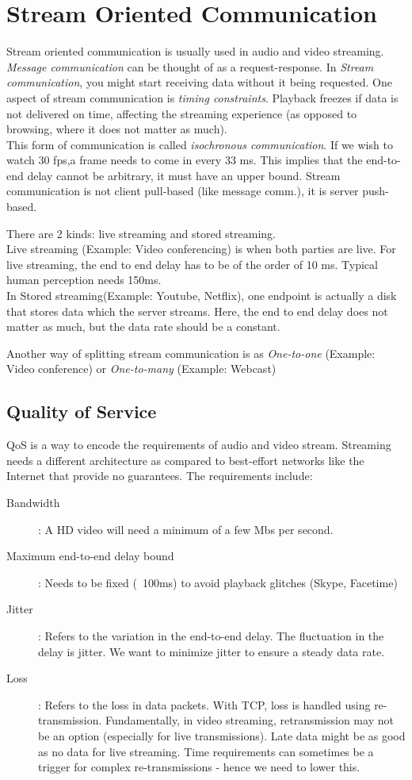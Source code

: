 \documentclass[twoside]{article}
\begin{document}
\section{Stream Oriented Communication}
Stream oriented communication is usually used in audio and video streaming.
\\\textit{Message communication} can be thought of as a request-response. In \textit{Stream communication}, you might start receiving data without it being requested. 
One aspect of stream communication is \textit{timing constraints}. 
Playback freezes if data is not delivered on time, affecting the streaming experience (as opposed to browsing, where it does not matter as much).\\
This form of communication is called \textit{isochronous communication}. If we wish to watch 30 fps,a frame needs to come in every 33 ms. This implies that the end-to-end delay cannot be arbitrary, it must have an upper bound. Stream communication is not client pull-based (like message comm.), it is server push-based. 

There are 2 kinds: live streaming and stored streaming.\\ Live streaming (Example: Video conferencing) is when both parties are live. For live streaming, the end to end delay has to be of the order of 10 ms. Typical human perception needs 150ms. \\
In Stored streaming(Example: Youtube, Netflix), one endpoint is actually a disk that stores data which the server streams. Here, the end to end delay does not matter as much, but the data rate should be a constant. 

Another way of splitting stream communication is as \textit{One-to-one} (Example: Video conference) or \textit{One-to-many} (Example: Webcast)

\subsection{Quality of Service}
QoS is a way to encode the requirements of audio and video stream.
Streaming needs a different architecture as compared to best-effort networks like the Internet that provide no guarantees.
The requirements include:
\begin{description}
\item[Bandwidth]: A HD video will need a minimum of a few Mbs per second.
\item[Maximum end-to-end delay bound]: Needs to be fixed (~100ms) to avoid playback glitches (Skype, Facetime)
\item[Jitter]: Refers to the variation in the end-to-end delay. The fluctuation in the delay is jitter. We want to minimize jitter to ensure a steady data rate.
\item[Loss]: Refers to the loss in data packets. With TCP, loss is handled using re-transmission. Fundamentally, in video streaming, retransmission may not be an option (especially for live transmissions). Late data might be as good as no data for live streaming. Time requirements can sometimes be a trigger for complex re-transmissions - hence we need to lower this.
\end{description}
\end{document}
